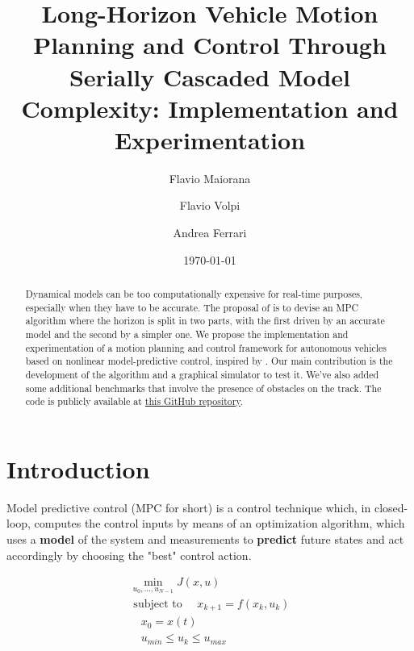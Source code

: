 \documentclass[a4paper, onecolumn, 12pt]{article}
\title{Long-Horizon Vehicle Motion Planning and Control Through Serially Cascaded Model Complexity: Implementation and Experimentation}
\author{Flavio Maiorana \and Flavio Volpi \and Andrea Ferrari}
\date{\today}
\begin{document}
\listoftodos

\maketitle
\begin{abstract}
    Dynamical models can be too computationally expensive for real-time
    purposes, especially when they have to be accurate. The proposal of
    \cite{paper} is to devise an MPC algorithm where the horizon is split in two
    parts, with the first driven by an accurate model and the second by a
    simpler one. We propose the implementation and experimentation of a motion
    planning and control framework for autonomous vehicles based on nonlinear
    model-predictive control, inspired by \cite{paper}. Our main contribution is
    the development of the algorithm and a graphical simulator to test it. We've
    also added some additional benchmarks that involve the presence of obstacles
    on the track. The code is publicly available at
    \href{https://github.com/neverorfrog/vehicle-control}{this GitHub
    repository}.
\end{abstract}

\newpage
\tableofcontents

\newpage
\section{Introduction}

Model predictive control (MPC for short) is a control technique which, in
closed-loop, computes the control inputs by means of an optimization algorithm,
which uses a \textbf{model} of the system and measurements to \textbf{predict}
future states and act accordingly by choosing the "best" control action. 

\begin{equation}
\begin{aligned}
    \min_{u_0,...,u_{N-1}}{J(x,u)} \\
    \text{ subject to }
        \quad x_{k+1} = f(x_k,u_k) \\
        \quad x_0 = x(t) \\
        \quad u_{min} \leq u_k \leq u_{max}
\end{aligned}
\end{equation}
\end{document}
